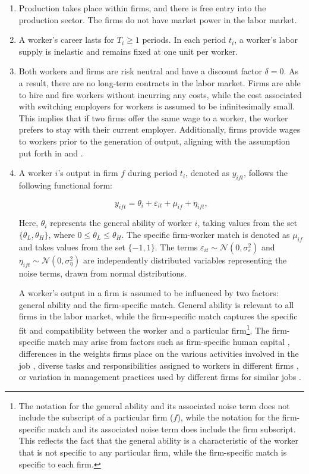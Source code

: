 \documentclass[12pt]{article}
\begin{document}
\begin{enumerate}[label={A}{\arabic*}.]
	\item Production takes place within firms, and there is free entry into the production sector. The firms do not have market power in the labor market.
	\item A worker's career lasts for $T_i\geq 1$ periods. In each period $t_i$, a worker's labor supply is inelastic and remains fixed at one unit per worker.
	\item Both workers and firms are risk neutral and have a discount factor $\delta = 0$. As a result, there are no long-term contracts in the labor market. Firms are able to hire and fire workers without incurring any costs, while the cost associated with switching employers for workers is assumed to be infinitesimally small. This implies that if two firms offer the same wage to a worker, the worker prefers to stay with their current employer. Additionally, firms provide wages to workers prior to the generation of output, aligning with the assumption put forth in \cite{gibbons1999theory} and \cite{ekinci2016employee}.
    \item A worker $i$'s output in firm $f$ during period $t_i$, denoted as $y_{ift}$, follows the following functional form:

        \begin{equation}
        y_{ift} = \theta_i + \varepsilon_{it} + \mu_{if} + \eta_{ift},
        \end{equation}

    Here, $\theta_i$ represents the general ability of worker $i$, taking values from the set $\{\theta_L, \theta_H\}$, where $0 \leq \theta_L \leq \theta_H$. The specific firm-worker match is denoted as $\mu_{if}$ and takes values from the set $\{-1, 1\}$. The terms $\varepsilon_{it} \sim \mathcal{N}(0, \sigma^2_{\varepsilon})$ and $\eta_{ift} \sim \mathcal{N}(0, \sigma^2_{\eta})$ are independently distributed variables representing the noise terms, drawn from normal distributions.

    A worker's output in a firm is assumed to be influenced by two factors: general ability and the firm-specific match. General ability is relevant to all firms in the labor market, while the firm-specific match captures the specific fit and compatibility between the worker and a particular firm\footnote{The notation for the general ability and its associated noise term does not include the subscript of a particular firm ($f$), while the notation for the firm-specific match and its associated noise term does include the firm subscript. This reflects the fact that the general ability is a characteristic of the worker that is not specific to any particular firm, while the firm-specific match is specific to each firm.}. The firm-specific match may arise from factors such as firm-specific human capital \citep{becker1962investment, becker1975investment}, differences in the weights firms place on the various activities involved in the job \citep{lazear2009firm}, diverse tasks and responsibilities assigned to workers in different firms \citep{gibbons2004task}, or variation in management practices used by different firms for similar jobs \citep{bloom2019drives, dessein2022organizational}.


\end{enumerate}
\end{document}
